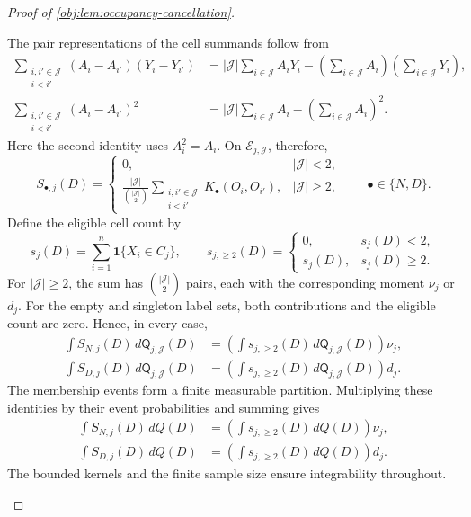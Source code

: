 \begin{proof}[Proof of \cref{obj:lem:occupancy-cancellation}]
\begin{enumerate}
The pair representations of the cell summands follow from
\[
\begin{aligned}
\sum_{\substack{i,i'\in\mathcal J\\i<i'}}
 (A_i-A_{i'})(Y_i-Y_{i'})
&=
|\mathcal J|\sum_{i\in\mathcal J}A_iY_i
-\left(\sum_{i\in\mathcal J}A_i\right)
 \left(\sum_{i\in\mathcal J}Y_i\right),\\
\sum_{\substack{i,i'\in\mathcal J\\i<i'}}
 (A_i-A_{i'})^2
&=
|\mathcal J|\sum_{i\in\mathcal J}A_i
-\left(\sum_{i\in\mathcal J}A_i\right)^2.
\end{aligned}
\]
Here the second identity uses \(A_i^2=A_i\). On
\(\mathcal E_{j,\mathcal J}\), therefore,
\[
S_{\bullet,j}(D)=
\begin{cases}
0,&|\mathcal J|<2,\\[3pt]
\displaystyle
\frac{|\mathcal J|}{\binom{|\mathcal J|}{2}}
\sum_{\substack{i,i'\in\mathcal J\\i<i'}}
K_\bullet(O_i,O_{i'}),&|\mathcal J|\ge2,
\end{cases}
\qquad \bullet\in\{N,D\}.
\]
Define the eligible cell count by
\[
s_j(D)=\sum_{i=1}^n\mathbf1\{X_i\in C_j\},
\qquad
s_{j,\ge2}(D)=
\begin{cases}
0,&s_j(D)<2,\\
s_j(D),&s_j(D)\ge2.
\end{cases}
\]
For \(|\mathcal J|\ge2\), the sum has
\(\binom{|\mathcal J|}{2}\) pairs, each with the corresponding moment
\(\nu_j\) or \(d_j\). For the empty and singleton label sets, both contributions and the eligible count are zero. Hence, in every case,
\[
\begin{aligned}
\int S_{N,j}(D)\,d\mathsf Q_{j,\mathcal J}(D)
&=
\left(\int s_{j,\ge2}(D)\,
 d\mathsf Q_{j,\mathcal J}(D)\right)\nu_j,\\
\int S_{D,j}(D)\,d\mathsf Q_{j,\mathcal J}(D)
&=
\left(\int s_{j,\ge2}(D)\,
 d\mathsf Q_{j,\mathcal J}(D)\right)d_j.
\end{aligned}
\]
The membership events form a finite measurable partition. Multiplying these identities by their event probabilities and summing gives
\[
\begin{aligned}
\int S_{N,j}(D)\,dQ(D)
&=\left(\int s_{j,\ge2}(D)\,dQ(D)\right)\nu_j,\\
\int S_{D,j}(D)\,dQ(D)
&=\left(\int s_{j,\ge2}(D)\,dQ(D)\right)d_j.
\end{aligned}
\]
The bounded kernels and the finite sample size ensure integrability throughout.


\end{enumerate}
\end{proof}
